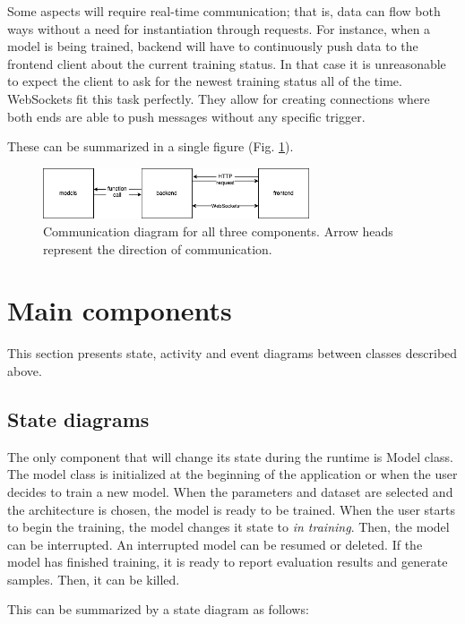 \documentclass{article}
\begin{document}
Some aspects will require real-time communication; that is, data can flow both ways without a need for instantiation through requests. For instance, when a model is being trained, backend will have to continuously push data to the frontend client about the current training status. In that case it is unreasonable to expect the client to ask for the newest training status all of the time. WebSockets fit this task perfectly. They allow for creating connections where both ends are able to push messages without any specific trigger.


These can be summarized in a single figure (Fig. \ref{fig:communication-diagram}).

\begin{figure}
    \centering
    \includegraphics[width=0.7\textwidth]{communication_diagram.png}
    \caption{Communication diagram for all three components. Arrow heads represent the direction of communication.}
    \label{fig:communication-diagram}
\end{figure}

\section{Main components}

This section presents state, activity and event diagrams between classes described above.

\subsection{State diagrams}
The only component that will change its state during the runtime is Model class. The model class is initialized at the beginning of the application or when the user decides to train a new model. When the parameters and dataset are selected and the architecture is chosen, the model is ready to be trained. When the user starts to begin the training, the model changes it state to \textit{in training}. Then, the model can be interrupted. An interrupted model can be resumed or deleted. If the model has finished training, it is ready to report evaluation results and generate samples. Then, it can be killed.

This can be summarized by a state diagram as follows:
\end{document}
